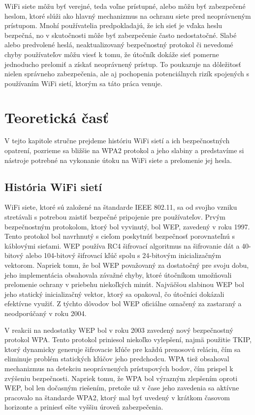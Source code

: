 \documentclass[12pt, twoside]{book}
\begin{document}
WiFi siete môžu byť verejné, teda voľne prístupné, alebo môžu byť zabezpečené heslom, ktoré slúži ako hlavný mechanizmus na ochranu siete pred neoprávneným prístupom. Mnohí používatelia predpokladajú, že ich sieť je vďaka heslu  bezpečná, no v skutočnosti môže byť zabezpečenie často nedostatočné. Slabé alebo predvolené heslá, neaktualizovaný bezpečnostný protokol či nevedomé chyby používateľov môžu viesť k tomu, že útočník dokáže sieť pomerne jednoducho prelomiť a získať neoprávnený prístup. To poukazuje na dôležitosť nielen správneho zabezpečenia, ale aj pochopenia potenciálnych rizík spojených s používaním WiFi sietí, ktorým sa táto práca venuje.


\section{Teoretická časť}
V tejto kapitole stručne prejdeme históriu WiFi sietí a ich bezpečnostných opatrení, pozrieme sa bližšie na WPA2 protokol a jeho slabiny a predstavíme si nástroje potrebné na vykonanie útoku na WiFi siete a prelomenie jej hesla.

\subsection{História WiFi sietí}
WiFi siete, ktoré sú založené na štandarde IEEE 802.11, sa od svojho vzniku stretávali s potrebou zaistiť bezpečné pripojenie pre používateľov. Prvým bezpečnostným protokolom, ktorý bol vyvinutý, bol WEP, zavedený v roku 1997. Tento protokol bol navrhnutý s cieľom poskytnúť bezpečnosť porovnateľnú s káblovými sieťami. WEP používa RC4 šifrovací algoritmus na šifrovanie dát a 40-bitový alebo 104-bitový šifrovací kľúč spolu s 24-bitovým inicializačným vektorom.\cite{vseob_1, vseob_2} Napriek tomu, že bol WEP považovaný za dostatočný pre svoju dobu, jeho implementácia obsahovala závažné chyby, ktoré útočníkom umožňovali prelomenie ochrany v priebehu niekoľkých minút. Najväčšou slabinou WEP bol jeho statický inicializačný vektor, ktorý sa opakoval, čo útočníci dokázali efektívne využiť.\cite{slabiny_po_2, vseob_2} Z týchto dôvodov bol WEP oficiálne označený za zastaraný a neodporúčaný v roku 2004.

V reakcii na nedostatky WEP bol v roku 2003 zavedený nový bezpečnostný protokol WPA. Tento protokol priniesol niekoľko vylepšení, najmä použitie TKIP, ktorý dynamicky generuje šifrovacie kľúče pre každú prenosovú reláciu, čím sa eliminuje problém statických kľúčov jeho predchodcu.\cite{slabiny_po_2} WPA tiež obsahoval mechanizmus na detekciu neoprávnených prístupových bodov, čím prispel k zvýšeniu bezpečnosti. Napriek tomu, že WPA bol výrazným zlepšením oproti WEP, bol len dočasným riešením, pretože už v čase jeho zavedenia sa aktívne pracovalo na štandarde WPA2, ktorý mal byť uvedený v krátkom časovom horizonte a priniesť ešte vyššiu úroveň zabezpečenia.
\end{document}
